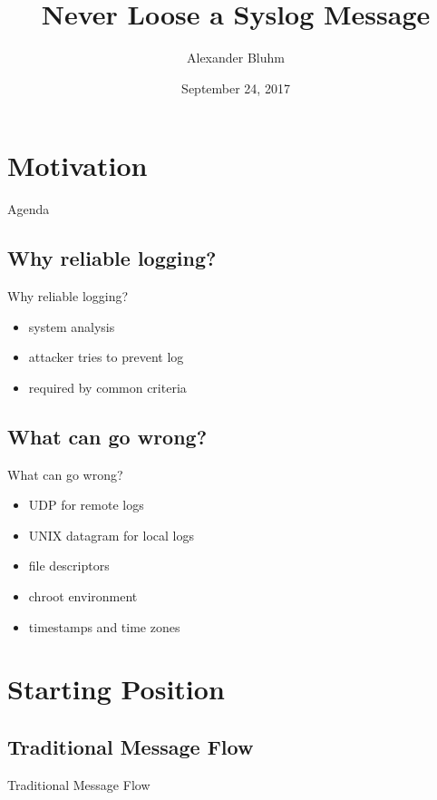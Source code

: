 \documentclass[14pt]{beamer}
\author{Alexander Bluhm}
\title{Never Loose a Syslog Message}
\institute{\url{bluhm@openbsd.org}}
\date{September 24, 2017}
\begin{document}
\begin{frame}
\titlepage
\end{frame}

\section{Motivation}

\begin{frame}{Agenda}
\setcounter{tocdepth}{1}
\tableofcontents
\end{frame}

\subsection{Why reliable logging?}
\begin{frame}{Why reliable logging?}
\begin{itemize}
    \item system analysis
    \item attacker tries to prevent log
    \item required by common criteria
\end{itemize}
\end{frame}

\subsection{What can go wrong?}
\begin{frame}{What can go wrong?}
\begin{itemize}
    \item UDP for remote logs
    \item UNIX datagram for local logs
    \item file descriptors
    \item chroot environment
    \item timestamps and time zones
\end{itemize}
\end{frame}

\section{Starting Position}

\subsection{Traditional Message Flow}
\begin{frame}{Traditional Message Flow}
\end{frame}
\end{document}
